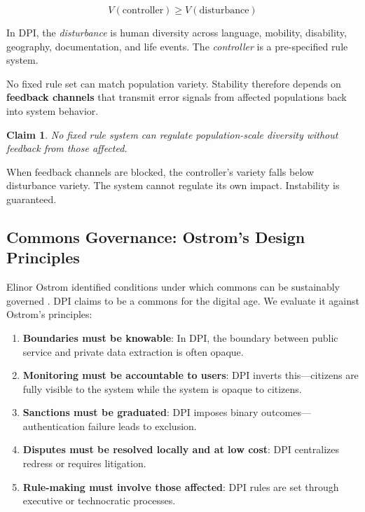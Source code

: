 \documentclass[11pt,a4paper]{article}
\newtheorem{claim}{Claim}
\begin{document}
\begin{equation}
V(\text{controller}) \geq V(\text{disturbance})
\end{equation}

In DPI, the \textit{disturbance} is human diversity across language, mobility, disability, geography, documentation, and life events. The \textit{controller} is a pre-specified rule system.

No fixed rule set can match population variety. Stability therefore depends on \textbf{feedback channels} that transmit error signals from affected populations back into system behavior.

\begin{claim}
No fixed rule system can regulate population-scale diversity without feedback from those affected.
\end{claim}

When feedback channels are blocked, the controller's variety falls below disturbance variety. The system cannot regulate its own impact. Instability is guaranteed.

\subsection{Commons Governance: Ostrom's Design Principles}

Elinor Ostrom identified conditions under which commons can be sustainably governed \citep{ostrom1990}. DPI claims to be a commons for the digital age. We evaluate it against Ostrom's principles:

\begin{enumerate}
    \item \textbf{Boundaries must be knowable}: In DPI, the boundary between public service and private data extraction is often opaque.
    \item \textbf{Monitoring must be accountable to users}: DPI inverts this---citizens are fully visible to the system while the system is opaque to citizens.
    \item \textbf{Sanctions must be graduated}: DPI imposes binary outcomes---authentication failure leads to exclusion.
    \item \textbf{Disputes must be resolved locally and at low cost}: DPI centralizes redress or requires litigation.
    \item \textbf{Rule-making must involve those affected}: DPI rules are set through executive or technocratic processes.
\end{enumerate}
\end{document}
